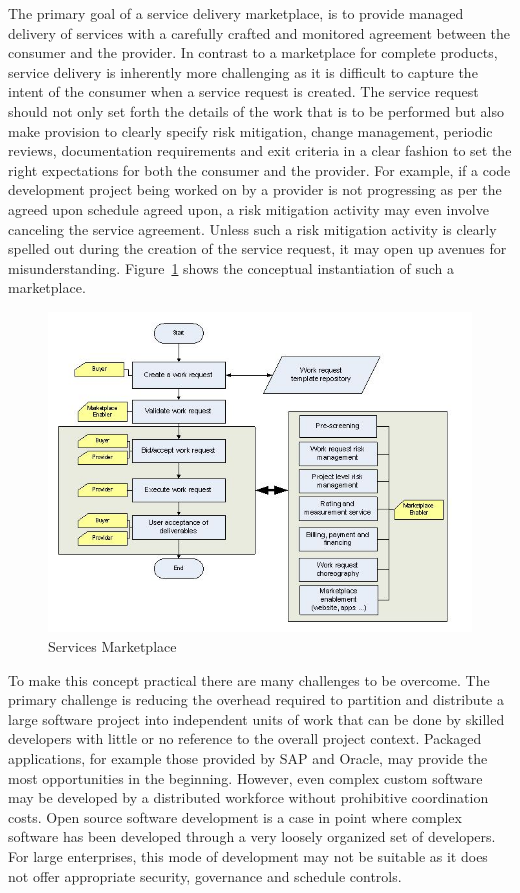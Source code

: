  The primary goal of a service delivery marketplace, is to provide managed delivery of services with a carefully crafted and monitored agreement between the consumer and the provider. In contrast to a marketplace for complete products, service delivery is inherently more challenging as it is difficult to capture the intent of the consumer when a service request is created. The service request should not only set forth the details of the work that is to be performed but also make provision to clearly specify risk mitigation, change management, periodic reviews, documentation requirements and exit criteria in a clear fashion to set the right expectations for both the consumer and the provider.  For example, if a code development project being worked on by a provider is not progressing as per the agreed upon schedule agreed upon, a risk mitigation activity may even involve canceling the service agreement. Unless such a risk mitigation activity is clearly spelled out during the creation of the service request, it may open up avenues for misunderstanding. Figure~\ref{glomarketplace} shows the conceptual instantiation of such a marketplace.
 
 \begin{figure}[h]
\includegraphics[scale=0.4]{figs/glomarketplace.jpg}
\caption{Services Marketplace}
\label{glomarketplace}
\end{figure}
 
 To make this concept practical there are many challenges to be overcome. The primary challenge is reducing the overhead required to partition and distribute a large software project into independent units of work that can be done by skilled developers with little or no reference to the overall project context. Packaged applications, for example those provided by SAP and Oracle, may provide the most opportunities in the beginning. However, even complex custom software may be developed by a distributed workforce without prohibitive coordination costs. Open source software development is a case in point where complex software has been developed through a very loosely organized set of developers. For large enterprises, this mode of development may not be suitable as it does not offer appropriate security, governance and schedule controls. 
 
